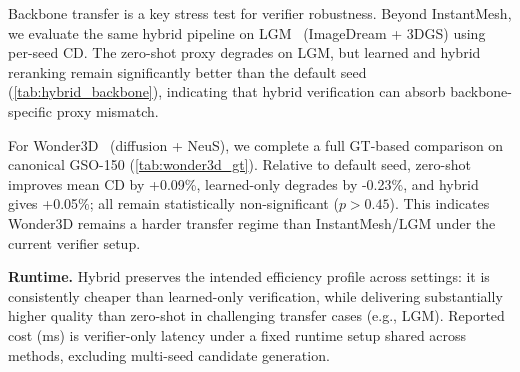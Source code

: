 Backbone transfer is a key stress test for verifier robustness. Beyond InstantMesh, we evaluate the same hybrid pipeline on LGM~\cite{lgm} (ImageDream + 3DGS) using per-seed CD. The zero-shot proxy degrades on LGM, but learned and hybrid reranking remain significantly better than the default seed (\cref{tab:hybrid_backbone}), indicating that hybrid verification can absorb backbone-specific proxy mismatch.



For Wonder3D~\cite{wonder3d} (diffusion + NeuS), we complete a full GT-based comparison on canonical GSO-150 (\cref{tab:wonder3d_gt}). Relative to default seed, zero-shot improves mean CD by +0.09\%, learned-only degrades by -0.23\%, and hybrid gives +0.05\%; all remain statistically non-significant ($p{>}0.45$). This indicates Wonder3D remains a harder transfer regime than InstantMesh/LGM under the current verifier setup.

\noindent\textbf{Runtime.}
Hybrid preserves the intended efficiency profile across settings: it is consistently cheaper than learned-only verification, while delivering substantially higher quality than zero-shot in challenging transfer cases (e.g., LGM). Reported cost (ms) is verifier-only latency under a fixed runtime setup shared across methods, excluding multi-seed candidate generation.

